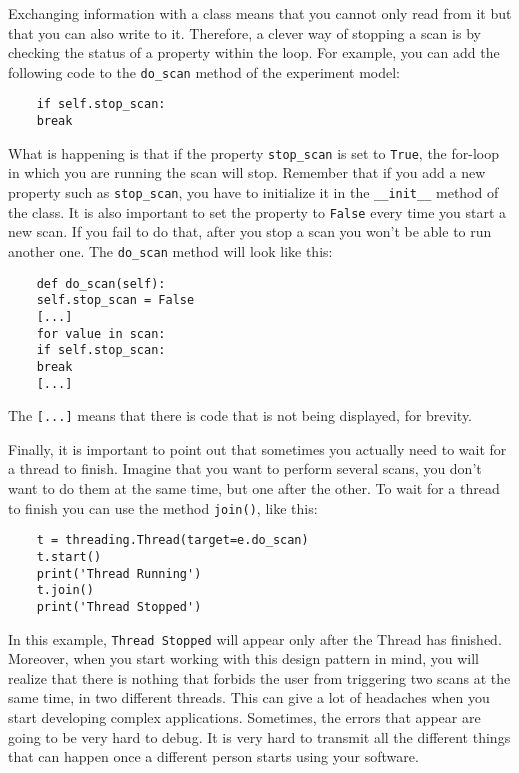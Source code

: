 Exchanging information with a class means that you cannot only read from
it but that you can also write to it. Therefore, a clever way of
stopping a scan is by checking the status of a property within the loop.
For example, you can add the following code to the \texttt{do_scan}
method of the experiment model:

\begin{verbatim}
    if self.stop_scan:
    break
\end{verbatim}

What is happening is that if the property \texttt{stop_scan} is set to
\texttt{True}, the for-loop in which you are running the scan will stop.
Remember that if you add a new property such as \texttt{stop_scan}, you
have to initialize it in the \texttt{__init__} method of the class.
It is also important to set the property to \texttt{False} every time
you start a new scan. If you fail to do that, after you stop a scan you
won't be able to run another one. The \texttt{do_scan} method will look
like this:

\begin{verbatim}
    def do_scan(self):
    self.stop_scan = False
    [...]
    for value in scan:
    if self.stop_scan:
    break
    [...]
\end{verbatim}

The \texttt{[...]} means that there is code that is not being
displayed, for brevity.



Finally, it is important to point out that sometimes you actually need
to wait for a thread to finish. Imagine that you want to perform several
scans, you don't want to do them at the same time, but one after the
other. To wait for a thread to finish you can use the method
\texttt{join()}, like this:

\begin{verbatim}
    t = threading.Thread(target=e.do_scan)
    t.start()
    print('Thread Running')
    t.join()
    print('Thread Stopped')
\end{verbatim}

In this example, \texttt{Thread Stopped} will appear only after the
Thread has finished. Moreover, when you start working with this design
pattern in mind, you will realize that there is nothing that forbids the
user from triggering two scans at the same time, in two different
threads. This can give a lot of headaches when you start developing
complex applications. Sometimes, the errors that appear are going to be
very hard to debug. It is very hard to transmit all the different things
that can happen once a different person starts using your software.

